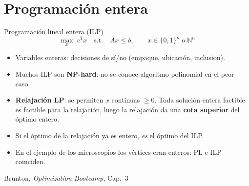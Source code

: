 \documentclass[10pt,aspectratio=169]{beamer}
\newcommand{\fuente}{\vfill{\scriptsize\color{gray}Brunton, \emph{Optimization Bootcamp}, Cap.~3}}
\begin{document}
\section{Programación entera}

\begin{frame}{Programación lineal entera (ILP)}
  \small
  \[
    \max_x\; c^T x \quad \text{s.t.}\quad Ax \le b,\qquad x \in \{0,1\}^n \;\text{o}\; \mathbb{N}^n
  \]
  \begin{itemize}
    \item Variables enteras: decisiones de sí/no (empaque, ubicación, inclusion).
    \item Muchos ILP son \textbf{NP-hard}: no se conoce algoritmo polinomial en el
      peor caso.
    \item \textbf{Relajación LP}: se permiten $x$ continuas $\ge 0$.
      Toda solución entera factible es factible para la relajación, luego la
      relajación da una \textbf{cota superior} del óptimo entero.
    \item Si el óptimo de la relajación ya es entero, \emph{es} el óptimo del ILP.
    \item En el ejemplo de los microscopios los vértices eran enteros: PL e ILP
      coinciden.
  \end{itemize}
  \fuente
\end{frame}
\end{document}
